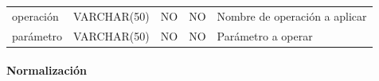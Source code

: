 \documentclass[12pt,a4paperpaper,]{report}
\let\oldparagraph\paragraph
\renewcommand{\paragraph}[1]{\oldparagraph{#1}\mbox{}}
\begin{document}
\begin{longtable}[]{@{}lllll@{}}
\begin{minipage}[t]{0.21\columnwidth}\raggedright\strut
operación\strut
\end{minipage} & \begin{minipage}[t]{0.19\columnwidth}\raggedright\strut
VARCHAR(50)\strut
\end{minipage} & \begin{minipage}[t]{0.16\columnwidth}\raggedright\strut
NO\strut
\end{minipage} & \begin{minipage}[t]{0.19\columnwidth}\raggedright\strut
NO\strut
\end{minipage} & \begin{minipage}[t]{0.11\columnwidth}\raggedright\strut
Nombre de operación a aplicar\strut
\end{minipage}\tabularnewline
\begin{minipage}[t]{0.21\columnwidth}\raggedright\strut
parámetro\strut
\end{minipage} & \begin{minipage}[t]{0.19\columnwidth}\raggedright\strut
VARCHAR(50)\strut
\end{minipage} & \begin{minipage}[t]{0.16\columnwidth}\raggedright\strut
NO\strut
\end{minipage} & \begin{minipage}[t]{0.19\columnwidth}\raggedright\strut
NO\strut
\end{minipage} & \begin{minipage}[t]{0.11\columnwidth}\raggedright\strut
Parámetro a operar\strut
\end{minipage}\tabularnewline
\bottomrule
\end{longtable}

\paragraph{Normalización}\label{normalizaciuxf3n-12}
\end{document}
